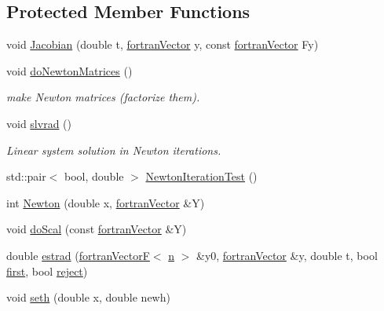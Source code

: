 \subsection*{Protected Member Functions}
\begin{DoxyCompactItemize}
\item 
void \hyperlink{classodes_1_1Radau5cc_a488b0601e6404991edfab78e4a2957e4}{Jacobian} (double t, \hyperlink{classodes_1_1fortranVector}{fortran\-Vector} y, const \hyperlink{classodes_1_1fortranVector}{fortran\-Vector} Fy)
\item 
void \hyperlink{classodes_1_1Radau5cc_ad0fe2959c9f23fcd76029cc54533ad07}{do\-Newton\-Matrices} ()
\begin{DoxyCompactList}\small\item\em make Newton matrices (factorize them). \end{DoxyCompactList}\item 
void \hyperlink{classodes_1_1Radau5cc_a78b4b4f6a4adb0d2de7dbbb0f841d082}{slvrad} ()
\begin{DoxyCompactList}\small\item\em Linear system solution in Newton iterations. \end{DoxyCompactList}\item 
std\-::pair$<$ bool, double $>$ \hyperlink{classodes_1_1Radau5cc_ac6b74a8cf1d2fdc83c8fec8189bd1d42}{Newton\-Iteration\-Test} ()
\item 
int \hyperlink{classodes_1_1Radau5cc_a7a78640ed38b67431551584da7cdbc09}{Newton} (double x, \hyperlink{classodes_1_1fortranVector}{fortran\-Vector} \&Y)
\item 
void \hyperlink{classodes_1_1Radau5cc_a2e6e502fa601a91fd32df312d6db47e2}{do\-Scal} (const \hyperlink{classodes_1_1fortranVector}{fortran\-Vector} \&Y)
\item 
double \hyperlink{classodes_1_1Radau5cc_a30bad88ca054d7dcf430a5d352a23d38}{estrad} (\hyperlink{classodes_1_1fortranVectorF}{fortran\-Vector\-F}$<$ \hyperlink{classodes_1_1Radau5cc_a3be3f05d2cdf7268e7d09b62ad9ad494}{n} $>$ \&y0, \hyperlink{classodes_1_1fortranVector}{fortran\-Vector} \&y, double t, bool \hyperlink{classodes_1_1Radau5cc_a788454a3dee88b6547430e881856fec7}{first}, bool \hyperlink{classodes_1_1Radau5cc_aedacfeb52f4072557c312adf7817bcf6}{reject})
\item 
void \hyperlink{classodes_1_1Radau5cc_aca7a11800037ae39edd9a6d644317653}{seth} (double x, double newh)
\end{DoxyCompactItemize}
